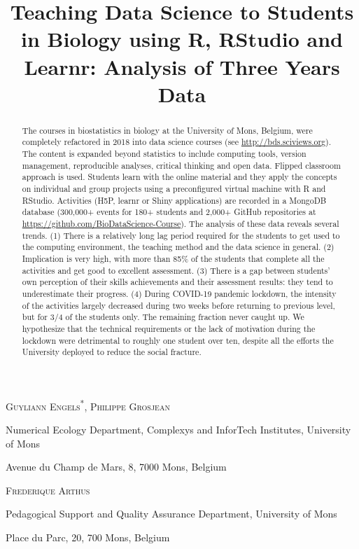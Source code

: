 \documentclass{aims}
\title[Teaching Data Science in
Biology] %
      {Teaching Data Science to Students in Biology using R, RStudio and
Learnr: Analysis of Three Years Data}
\author[Guyliann Engels, Philippe Grosjean and Frédérique Arthus]{}
\theoremstyle{definition}
\begin{document}
\maketitle

\centerline{\scshape Guyliann Engels\textsuperscript{*}, Philippe Grosjean}
\medskip
{\footnotesize
 \centerline{Numerical Ecology Department, Complexys and InforTech Institutes, University of Mons}
   \centerline{Avenue du Champ de Mars, 8, 7000 Mons, Belgium}
} %

\medskip

\centerline{\scshape Frederique Arthus}
\medskip
{\footnotesize
 \centerline{ Pedagogical Support and Quality Assurance Department, University of Mons}
   \centerline{Place du Parc, 20, 700 Mons, Belgium}
}

\bigskip



\begin{abstract}
  The courses in biostatistics in biology at the University of Mons,
  Belgium, were completely refactored in 2018 into data science courses
  (see \url{http://bds.sciviews.org}). The content is expanded beyond
  statistics to include computing tools, version management,
  reproducible analyses, critical thinking and open data. Flipped
  classroom approach is used. Students learn with the online material
  and they apply the concepts on individual and group projects using a
  preconfigured virtual machine with R and RStudio. Activities (H5P,
  learnr or Shiny applications) are recorded in a MongoDB database
  (300,000+ events for 180+ students and 2,000+ GitHub repositories at
  \url{https://github.com/BioDataScience-Course}). The analysis of these
  data reveals several trends. (1) There is a relatively long lag period
  required for the students to get used to the computing environment,
  the teaching method and the data science in general. (2) Implication
  is very high, with more than 85\% of the students that complete all
  the activities and get good to excellent assessment. (3) There is a
  gap between students' own perception of their skills achievements and
  their assessment results: they tend to underestimate their progress.
  (4) During COVID-19 pandemic lockdown, the intensity of the activities
  largely decreased during two weeks before returning to previous level,
  but for 3/4 of the students only. The remaining fraction never caught
  up. We hypothesize that the technical requirements or the lack of
  motivation during the lockdown were detrimental to roughly one student
  over ten, despite all the efforts the University deployed to reduce
  the social fracture.
\end{abstract}
\end{document}
